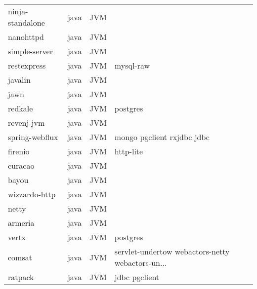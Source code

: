 \begin{longtable}{llll}
    ninja-standalone & java        & JVM         &                                                    \\
    nanohttpd        & java        & JVM         &                                                    \\
    simple-server    & java        & JVM         &                                                    \\
    restexpress      & java        & JVM         & mysql-raw                                          \\
    javalin          & java        & JVM         &                                                    \\
    jawn             & java        & JVM         &                                                    \\
    redkale          & java        & JVM         & postgres                                           \\
    revenj-jvm       & java        & JVM         &                                                    \\
    spring-webflux   & java        & JVM         & mongo pgclient rxjdbc jdbc                         \\
    firenio          & java        & JVM         & http-lite                                          \\
    curacao          & java        & JVM         &                                                    \\
    bayou            & java        & JVM         &                                                    \\
    wizzardo-http    & java        & JVM         &                                                    \\
    netty            & java        & JVM         &                                                    \\
    armeria          & java        & JVM         &                                                    \\
    vertx            & java        & JVM         & postgres                                           \\
    comsat           & java        & JVM         & servlet-undertow webactors-netty webactors-un...   \\
    ratpack          & java        & JVM         & jdbc pgclient                                      \\

\end{longtable}
